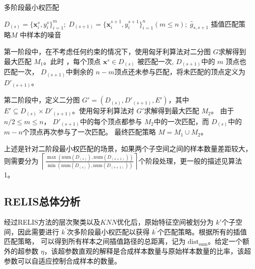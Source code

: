 \documentclass[12pt,a4paper]{article}%
\begin{document}
		\begin{algorithm}[b!]
			\caption{多阶段最小权匹配}
			\label{a2}
			\renewcommand{\algorithmicrequire}{\textbf{输入:}}
			\renewcommand{\algorithmicensure}{\textbf{输出:}}
			\begin{algorithmic}[1]
				\REQUIRE $D_{(s)}=\{\boldsymbol{x}_i^{s},y_i^s\}_{i=1}^m;\;D_{(s+1)}=\{\boldsymbol{x}_i^{s+1},y_i^{s+1}\}_{i=1}^n(m\le{n});\;\hat{g}_{s,s+1}$  %
				\ENSURE 插值匹配策略$M$    %
				中样本的噪音
			\end{algorithmic}
		\end{algorithm}

		第一阶段中，在不考虑任何约束的情况下，使用匈牙利算法对二分图 $G$求解得到最大匹配 $M_1$。此时 ，每个顶点 $\boldsymbol{x}^s\in D_{(s)}$ 被匹配一次, $D_{(s+1)}$中的 $m$ 顶点也匹配一次， 
		$D_{(s+1)}$中剩余的 $n-m$顶点还未参与匹配，将未匹配的顶点定义为$D'_{(s+1)}$。

		第二阶段中，定义二分图 $G'=(D_{(s)},D'_{(s+1)},E')$，其中 $E'\subseteq D_{(s)}\times D'_{(s+1)}$。使用匈牙利算法对 $G'$求解得到最大匹配 $M_2$。
		由于 $n/2\le m\le n$， $D'_{(s+1)}$中的每个顶点都参与 $M_2$中的一次匹配，而 $D_{(s)}$中的 $m-n$个顶点再次参与了一次匹配。 最终匹配策略 $M=M_1\cup{M_2}$。

		上述是针对二阶段最小权匹配的场景，如果两个子空间之间的样本数量差距较大，则需要分为 $\left\lceil \frac{\max(\text{num}{(D_{(s)}),\text{num}(D_{(s+1)})})}{\min(\text{num}{(D_{(s)}),\text{num}(D_{(s+1)})})}\right\rceil$个阶段处理，更一般的描述见算法1。


	\subsection{RELIS总体分析}

	经过RELIS方法的层次聚类以及$KNN$优化后，原始特征空间被划分为 $k'$个子空间，因此需要进行 $k^\prime$次多阶段最小权匹配以获得 $k^\prime$个匹配策略。根据所有的插值匹配策略，
	可以得到所有样本之间插值路径的总距离，记为 $\text{dist}_{\text{sum}}$。给定一个额外的超参数 $\eta$，该超参数直观的解释是合成样本数量与原始样本数量的比率，该超参数可以自适应控制合成样本的数量。
\end{document}
